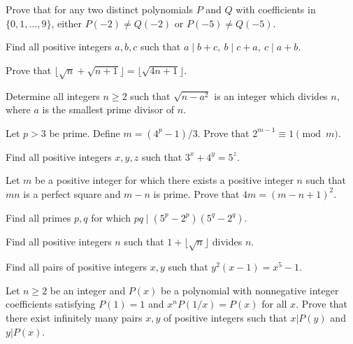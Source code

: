 \begin{problem}{\label{p:i:n:pr:34}}
  Prove that for any two distinct polynomials $P$ and $Q$ with coefficients in
    $\{0,1,\ldots,9\}$, either $P(-2)\ne Q(-2)$ or $P(-5)\ne Q(-5)$.
\end{problem}
\begin{problem}{\label{p:i:n:pr:35}}
  Find all positive integers $a,b,c$ such that $a\mid b+c,\ b\mid c+a,\
    c\mid a+b$.
\end{problem}
\begin{problem}{\label{p:i:n:pr:36}}
  Prove that $\lfloor\sqrt n+\sqrt{n+1}\rfloor=\lfloor\sqrt{4n+1}\rfloor$.
\end{problem}
\begin{problem}{\label{p:i:n:pr:37}}
  Determine all integers $n \geq 2$ such that $\sqrt{n-a^2}$ is an integer
    which divides $n$, where $a$ is the smallest prime divisor of $n$.
\end{problem}
\begin{problem}{\label{p:i:n:pr:38}}
    Let $p>3$ be prime. Define $m=(4^p-1)/3$. Prove that $2^{m-1}\equiv
    1\pmod m$.
\end{problem}
\begin{problem}{\label{p:i:n:pr:39}}
  Find all positive integers $x,y,z$ such that $3^x+4^y=5^z$.
\end{problem}
\begin{problem}{\label{p:i:n:pr:40}}
  Let $m$ be a positive integer for which there exists a positive integer
    $n$ such that $mn$ is a perfect square and $m-n$ is
    prime. Prove that $4m=(m-n+1)^2$.
\end{problem}
\begin{problem}{\label{p:i:n:pr:41}}
  Find all primes $p,q$ for which $pq\mid (5^p-2^p)(5^q-2^q)$.
\end{problem}
\begin{problem}{\label{p:i:n:pr:42}}
  Find all positive integers $n$ such that $1+\lfloor\sqrt n\rfloor$
    divides $n$.
\end{problem}
\begin{problem}{\label{p:i:n:pr:43}}
  Find all pairs of positive integers $x,y$ such that $y^2(x-1)=x^5-1$.
\end{problem}
\begin{problem}{\label{p:i:n:pr:44}}
  Let $n\ge 2$ be an integer and
    $P(x)$ be a polynomial with nonnegative integer coefficients satisfying
    $P(1)=1$ and $x^n P(1/x)=P(x)$ for all $x$.
    Prove that there exist infinitely many
    pairs $x, y$ of positive integers such that $x|P(y)$ and $y|P(x)$.
\end{problem}
